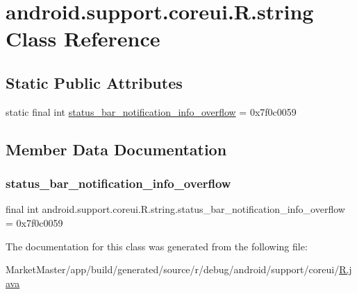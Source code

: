 \hypertarget{classandroid_1_1support_1_1coreui_1_1R_1_1string}{}\section{android.\+support.\+coreui.\+R.\+string Class Reference}
\label{classandroid_1_1support_1_1coreui_1_1R_1_1string}
\subsection*{Static Public Attributes}
\begin{DoxyCompactItemize}
\item 
static final int \mbox{\hyperlink{classandroid_1_1support_1_1coreui_1_1R_1_1string_adcf4ea883d32357717589d816f0e05ce}{status\+\_\+bar\+\_\+notification\+\_\+info\+\_\+overflow}} = 0x7f0c0059
\end{DoxyCompactItemize}


\subsection{Member Data Documentation}
\mbox{\label{classandroid_1_1support_1_1coreui_1_1R_1_1string_adcf4ea883d32357717589d816f0e05ce}} 
\subsubsection{\texorpdfstring{status\+\_\+bar\+\_\+notification\+\_\+info\+\_\+overflow}{status\_bar\_notification\_info\_overflow}}
{\footnotesize\ttfamily final int android.\+support.\+coreui.\+R.\+string.\+status\+\_\+bar\+\_\+notification\+\_\+info\+\_\+overflow = 0x7f0c0059\hspace{0.3cm}{\ttfamily [static]}}



The documentation for this class was generated from the following file\+:\begin{DoxyCompactItemize}
\item 
Market\+Master/app/build/generated/source/r/debug/android/support/coreui/\mbox{\hyperlink{debug_2android_2support_2coreui_2R_8java}{R.\+java}}\end{DoxyCompactItemize}
